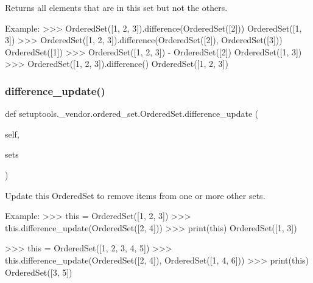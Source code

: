 \begin{DoxyVerb}Returns all elements that are in this set but not the others.

Example:
    >>> OrderedSet([1, 2, 3]).difference(OrderedSet([2]))
    OrderedSet([1, 3])
    >>> OrderedSet([1, 2, 3]).difference(OrderedSet([2]), OrderedSet([3]))
    OrderedSet([1])
    >>> OrderedSet([1, 2, 3]) - OrderedSet([2])
    OrderedSet([1, 3])
    >>> OrderedSet([1, 2, 3]).difference()
    OrderedSet([1, 2, 3])
\end{DoxyVerb}
 \mbox{\label{classsetuptools_1_1__vendor_1_1ordered__set_1_1OrderedSet_ae489e12fb9d24f6a1c01c298837e6fe3}} 
\subsubsection{\texorpdfstring{difference\+\_\+update()}{difference\_update()}}
{\footnotesize\ttfamily def setuptools.\+\_\+vendor.\+ordered\+\_\+set.\+Ordered\+Set.\+difference\+\_\+update (\begin{DoxyParamCaption}\item[{}]{self,  }\item[{}]{sets }\end{DoxyParamCaption})}

\begin{DoxyVerb}Update this OrderedSet to remove items from one or more other sets.

Example:
    >>> this = OrderedSet([1, 2, 3])
    >>> this.difference_update(OrderedSet([2, 4]))
    >>> print(this)
    OrderedSet([1, 3])

    >>> this = OrderedSet([1, 2, 3, 4, 5])
    >>> this.difference_update(OrderedSet([2, 4]), OrderedSet([1, 4, 6]))
    >>> print(this)
    OrderedSet([3, 5])
\end{DoxyVerb}
 \mbox{\label{classsetuptools_1_1__vendor_1_1ordered__set_1_1OrderedSet_aba1c2bb8144014dfad2f2d4872fe1337}} 
